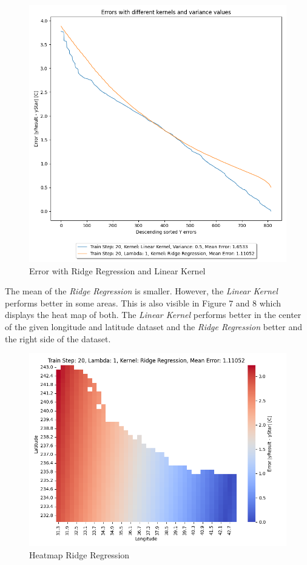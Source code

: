 \documentclass[10pt, a4paper, twocolumn]{article} %
\begin{document}
\begin{figure}[htbp] %
  \centering
  \includegraphics[width=\columnwidth]{pics/TrainStep20_LK_RR.png}
  \caption{Error with Ridge Regression and Linear Kernel}
  \label{fig:fibonacciPlot}
\end{figure}
The mean of the \textit{Ridge Regression} is smaller. However, the \textit{Linear Kernel} performs better in some areas. This is also visible in Figure 7 and 8 which displays the heat map of both. The \textit{Linear Kernel} performs better in the center of the given longitude and latitude dataset and the \textit{Ridge Regression} better and the right side of the dataset. 
\begin{figure}[htbp] %
  \centering
  \includegraphics[width=\columnwidth]{pics/TrainStep20_HM_RR.png}
  \caption{Heatmap Ridge Regression}
  \label{fig:fibonacciPlot}
\end{figure}
\end{document}
